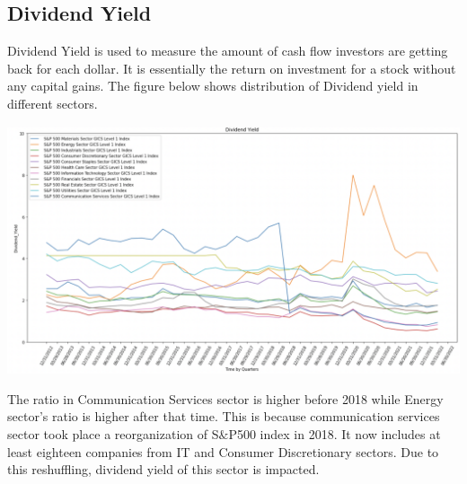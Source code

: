 \documentclass{article}
\begin{document}
\subsection{Dividend Yield}
Dividend Yield is used to measure the amount of cash flow investors are getting back for each dollar. It is essentially the return on investment for a stock without any capital gains. The figure below shows distribution of Dividend yield in different sectors.
\begin{center}
    \includegraphics[scale=0.4]{Div_Yield.png}
\end{center}
The ratio in Communication Services sector is higher before 2018 while Energy sector’s ratio is higher after that time. This is because communication services sector took place a reorganization of S$\&$P500 index in 2018. It now includes at least eighteen companies from IT and Consumer Discretionary sectors. Due to this reshuffling, dividend yield of this sector is impacted.
\end{document}

